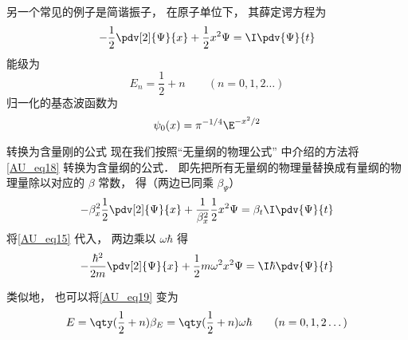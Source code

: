 另一个常见的例子是简谐振子， 在原子单位下， 其薛定谔方程为
\begin{equation}\label{AU_eq18}
-\frac12 \pdv[2]{\Psi}{x} + \frac12 x^2 \Psi= \I\pdv{\Psi}{t}
\end{equation}
能级为
\begin{equation}\label{AU_eq19}
E_n = \frac12 + n \qquad (n = 0, 1, 2\dots)
\end{equation}
归一化的基态波函数为
\begin{equation}
\psi_0(x) = \pi^{-1/4} \E^{-x^2/2}
\end{equation}


\begin{example}{转换为含量刚的公式}
现在我们按照“无量纲的物理公式” 中介绍的方法将\autoref{AU_eq18} 转换为含量纲的公式． 即先把所有无量纲的物理量替换成有量纲的物理量除以对应的 $\beta$ 常数， 得（两边已同乘 $\beta_\Psi$）
\begin{equation}
-\beta_x^2\frac12 \pdv[2]{\Psi}{x} + \frac{1}{\beta_x^2}\frac12 x^2 \Psi= \beta_t\I\pdv{\Psi}{t}
\end{equation}
将\autoref{AU_eq15} 代入， 两边乘以 $\omega\hbar$ 得
\begin{equation}
-\frac{\hbar^2}{2m} \pdv[2]{\Psi}{x} + \frac12 m\omega^2 x^2 \Psi= \I\hbar\pdv{\Psi}{t}
\end{equation}

类似地， 也可以将\autoref{AU_eq19} 变为
\begin{equation}
E =  \qty(\frac12 + n)\beta_E = \qty(\frac12 + n)\omega\hbar \qquad (n = 0, 1, 2\dots)
\end{equation}
\end{example}
